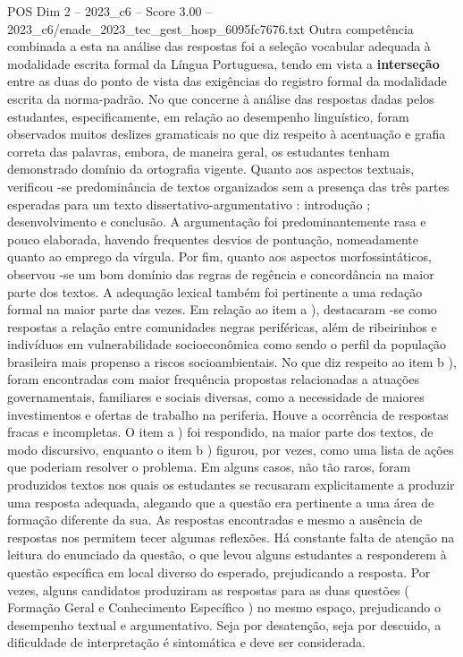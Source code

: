 \begin{textsample}{POS Dim 2 – 2023\_c6 – Score 3.00 – 2023\_c6/enade\_2023\_tec\_gest\_hosp\_6095fc7676.txt}
Outra competência combinada a esta na análise das respostas foi a seleção vocabular adequada à modalidade escrita formal da Língua Portuguesa, tendo em vista a \textbf{interseção} entre as duas do ponto de vista das exigências do registro formal da modalidade escrita da norma-padrão.
No que concerne à análise das respostas dadas pelos estudantes, especificamente, em relação ao desempenho linguístico, foram observados muitos deslizes gramaticais no que diz respeito à acentuação e grafia correta das palavras, embora, de maneira geral, os estudantes tenham demonstrado domínio da ortografia vigente.
Quanto aos aspectos textuais, verificou -se predominância de textos organizados sem a presença das três partes esperadas para um texto dissertativo-argumentativo : introdução ; desenvolvimento e conclusão.
A argumentação foi predominantemente rasa e pouco elaborada, havendo frequentes desvios de pontuação, nomeadamente quanto ao emprego da vírgula.
Por fim, quanto aos aspectos morfossintáticos, observou -se um bom domínio das regras de regência e concordância na maior parte dos textos.
A adequação lexical também foi pertinente a uma redação formal na maior parte das vezes.
Em relação ao item a ), destacaram -se como respostas a relação entre comunidades negras periféricas, além de ribeirinhos e indivíduos em vulnerabilidade socioeconômica como sendo o perfil da população brasileira mais propenso a riscos socioambientais.
No que diz respeito ao item b ), foram encontradas com maior frequência propostas relacionadas a atuações governamentais, familiares e sociais diversas, como a necessidade de maiores investimentos e ofertas de trabalho na periferia.
Houve a ocorrência de respostas fracas e incompletas.
O item a ) foi respondido, na maior parte dos textos, de modo discursivo, enquanto o item b ) figurou, por vezes, como uma lista de ações que poderiam resolver o problema.
Em alguns casos, não tão raros, foram produzidos textos nos quais os estudantes se recusaram explicitamente a produzir uma resposta adequada, alegando que a questão era pertinente a uma área de formação diferente da sua.
As respostas encontradas e mesmo a ausência de respostas nos permitem tecer algumas reflexões.
Há constante falta de atenção na leitura do enunciado da questão, o que levou alguns estudantes a responderem à questão específica em local diverso do esperado, prejudicando a resposta.
Por vezes, alguns candidatos produziram as respostas para as duas questões ( Formação Geral e Conhecimento Específico ) no mesmo espaço, prejudicando o desempenho textual e argumentativo.
Seja por desatenção, seja por descuido, a dificuldade de interpretação é sintomática e deve ser considerada.

\end{textsample}
